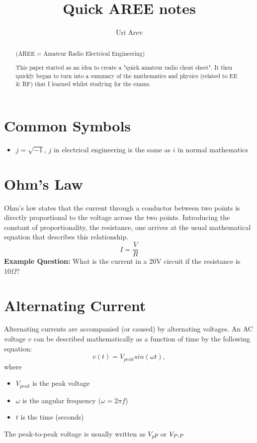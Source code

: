 \documentclass[12pt,a4paper,oneside]{article}
\author{Uri Arev}
\title{Quick AREE notes}
\date{}
\begin{document}
\maketitle
\tableofcontents
\begin{abstract}
	\begin{center}
		(AREE = Amateur Radio Electrical Engineering)
	\end{center}

	This paper started as an idea to create a "quick amateur radio cheat sheet". It then quickly began to turn into a summary of the mathematics and physics (related to EE \& RF) that I learned whilst studying for the exams.
\end{abstract}
\section{Common Symbols}
\begin{itemize}
	\item \Large{\(j = \sqrt{-1}\)}, \(j\) in electrical engineering is the same as \(i\) in normal mathematics
\end{itemize}
\section{Ohm's Law}
Ohm's law states that the current through a conductor between two points is directly proportional to the voltage across the two points. Introducing the constant of proportionality, the resistance, one arrives at the usual mathematical equation that describes this relationship.
\[
	I = \frac VR
\]
\textbf{Example Question:} What is the current in a 20V circuit if the resistance is \(10\Omega\)?
\section{Alternating Current}
Alternating currents are accompanied (or caused) by alternating voltages. An AC voltage \(v\) can be described mathematically as a function of time by the following equation:
\[
	v(t) = V_{peak} sin(\omega t),
\]
where
\begin{itemize}
	\item \(V_{peak}\) is the peak voltage
	\item \(\omega\) is the angular frequency (\(\omega = 2 \pi f\))
	\item \(t\) is the time (seconds)
\end{itemize}

The peak-to-peak voltage is usually written as \(V_pp\) or \(V_{P\text-P}\)
\end{document}
